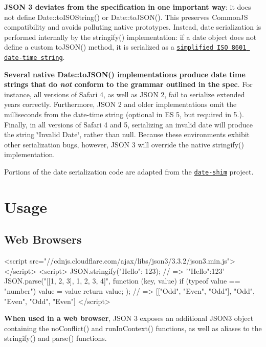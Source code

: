 {\bfseries J\+S\+ON 3 deviates from the specification in one important way}\+: it does not define {\ttfamily Date\+::to\+I\+S\+O\+String()} or {\ttfamily Date\+::to\+J\+S\+O\+N()}. This preserves Common\+JS compatibility and avoids polluting native prototypes. Instead, date serialization is performed internally by the {\ttfamily stringify()} implementation\+: if a date object does not define a custom {\ttfamily to\+J\+S\+O\+N()} method, it is serialized as a \href{http://es5.github.com/#x15.9.1.15}{\tt simplified I\+SO 8601 date-\/time string}.

{\bfseries Several native {\ttfamily Date\+::to\+J\+S\+O\+N()} implementations produce date time strings that do {\itshape not} conform to the grammar outlined in the spec}. For instance, all versions of Safari 4, as well as J\+S\+ON 2, fail to serialize extended years correctly. Furthermore, J\+S\+ON 2 and older implementations omit the milliseconds from the date-\/time string (optional in ES 5, but required in 5.). Finally, in all versions of Safari 4 and 5, serializing an invalid date will produce the string {\ttfamily \char`\"{}\+Invalid Date\char`\"{}}, rather than {\ttfamily null}. Because these environments exhibit other serialization bugs, however, J\+S\+ON 3 will override the native {\ttfamily stringify()} implementation.

Portions of the date serialization code are adapted from the \href{https://github.com/Yaffle/date-shim}{\tt {\ttfamily date-\/shim}} project.

\section*{Usage}

\subsection*{Web Browsers}

\begin{DoxyVerb}<script src="//cdnjs.cloudflare.com/ajax/libs/json3/3.3.2/json3.min.js"></script>
<script>
  JSON.stringify({"Hello": 123});
  // => '{"Hello":123}'
  JSON.parse("[[1, 2, 3], 1, 2, 3, 4]", function (key, value) {
    if (typeof value == "number") {
      value = value %
    }
    return value;
  });
  // => [["Odd", "Even", "Odd"], "Odd", "Even", "Odd", "Even"]
</script>
\end{DoxyVerb}


{\bfseries When used in a web browser}, J\+S\+ON 3 exposes an additional {\ttfamily J\+S\+O\+N3} object containing the {\ttfamily no\+Conflict()} and {\ttfamily run\+In\+Context()} functions, as well as aliases to the {\ttfamily stringify()} and {\ttfamily parse()} functions.

